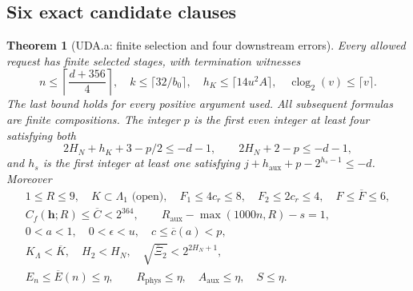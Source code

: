 \documentclass[11pt]{article}
\theoremstyle{plain}
\newtheorem{theorem}{Theorem}[section]
\theoremstyle{definition}
\theoremstyle{remark}
\begin{document}
\subsection{Six exact candidate clauses}
\begin{theorem}[UDA.a: finite selection and four downstream errors]
\label{uda:clause-a}
Every allowed request has finite selected stages, with termination witnesses
\[
 n\le\left\lceil\frac{d+356}{4}\right\rceil,\quad
 k\le\lceil32/b_0\rceil,\quad
 h_K\le\lceil14u^2A\rceil,\quad
 \operatorname{clog}_2(v)\le\lceil v\rceil.
\]
The last bound holds for every positive argument used. All subsequent
formulas are finite compositions. The integer $p$ is the first even
integer at least four satisfying both
\[
 2H_N+h_K+3-p/2\le-d-1,\qquad2H_N+2-p\le-d-1,
\]
and $h_s$ is the first integer at least one satisfying
$j+h_{\mathrm{aux}}+p-2^{h_s-1}\le-d$. Moreover
\begin{gather*}
 1\le R\le9,\quad K\subset\Lambda_1\text{ (open)},\quad
 F_1\le4c_r\le8,\quad F_2\le2c_r\le4,\quad F\le\overline F\le6,\\
 C_f(\mathbf h;R)\le\overline C<2^{364},\qquad
 R_{\mathrm{aux}}-\max(1000n,R)-s=1,\\
 0<a<1,\quad0<\epsilon<u,\quad c\le\overline c(a)<p,\\
 K_\Lambda<\overline K,\quad H_2<H_N,\quad
 \sqrt{\overline\Xi_2}<2^{2H_N+1},\\
 E_n\le\overline E(n)\le\eta,\qquad
 R_{\mathrm{phys}}\le\eta,\quad A_{\mathrm{aux}}\le\eta,\quad S\le\eta.
\end{gather*}
\end{theorem}
\end{document}
